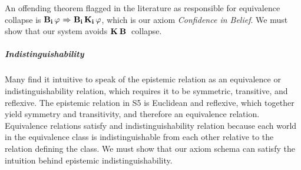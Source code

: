 An offending theorem flagged in the literature as responsible for equivalence collapse is $\mathbf{B}_{\mathbf{i}}\,\varphi {\ \Rightarrow \ } \mathbf{B}_{\mathbf{i}}\,\mathbf{K}_{\mathbf{i}}\,\varphi$, which is our axiom \emph{Confidence in Belief}. We must show that our system avoids $\mathbf{K}_{\mathbf{}}\,\mathbf{B}_{\mathbf{}}\,$ collapse.

\subparagraph{Indistinguishability}
Many find it intuitive to speak of the epistemic relation as an equivalence or indistinguishability relation, which requires it to be symmetric, transitive, and reflexive. The epistemic relation in S5 is Euclidean and reflexive, which together yield symmetry and transitivity, and therefore an equivalence relation. Equivalence relations satisfy and indistinguishability relation because each world in the equivalence class is indistinguishable from each other relative to the relation defining the class. We must show that our axiom schema can satisfy the intuition behind epistemic indistinguishability.

